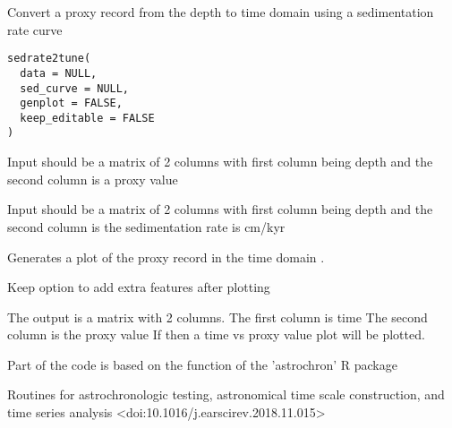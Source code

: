 \documentclass[a4paper]{book}
\begin{document}
%
\begin{Description}
Convert a proxy record from the depth to time domain using
a sedimentation rate curve
\end{Description}
%
\begin{Usage}
\begin{verbatim}
sedrate2tune(
  data = NULL,
  sed_curve = NULL,
  genplot = FALSE,
  keep_editable = FALSE
)
\end{verbatim}
\end{Usage}
%
\begin{Arguments}
\begin{ldescription}
\item[\code{data}] Input should be a matrix of 2 columns with first column being depth and the second column
is a proxy value

\item[\code{sed\_curve}] Input should be a matrix of 2 columns with first column being depth and the second column
is the sedimentation rate is cm/kyr

\item[\code{genplot}] Generates a plot of the proxy record in  the time domain .

\item[\code{keep\_editable}] Keep option to add extra features after plotting  
\end{ldescription}
\end{Arguments}
%
\begin{Value}
The output is a matrix with 2 columns.
The first column is time
The second column is the proxy value
If  then a time vs proxy value plot will be plotted.
\end{Value}
%
\begin{Author}
Part of the code is based on the 
function of the 'astrochron' R package
\end{Author}
%
\begin{References}
Routines for astrochronologic testing, astronomical time scale construction, and
time series analysis <doi:10.1016/j.earscirev.2018.11.015>
\end{References}
%
\end{document}
